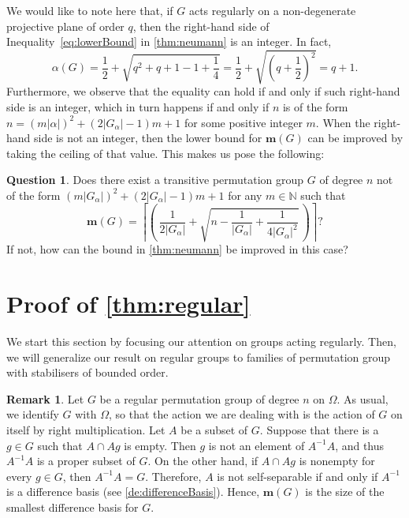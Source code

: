 \documentclass[a4paper]{amsart}
\newcommand{\m}{\mathbf{m}}
\newcommand{\NN}{\mathbb{N}}
\theoremstyle{definition}
\newtheorem{remark}[theorem]{Remark}
\newtheorem{vprasanje}[theorem]{Question}
\begin{document}
We would like to note here that, if $G$ acts regularly on a non-degenerate projective plane of order $q$, then the right-hand side of Inequality~\eqref{eq:lowerBound}  in \cref{thm:neumann} is an integer. In fact,
\[ \alpha (G) = \frac{1}{2} + \sqrt{q^2 + q + 1 - 1 + \frac{1}{4}} = \frac{1}{2} + \sqrt{\left( q + \frac{1}{2} \right) ^2 } = q+1  .\]
Furthermore, we observe that the equality can hold if and only if such right-hand side is an integer, which in turn happens if and only if $n$ is of the form $n = (m|\alpha|)^2 + (2|G_\alpha|-1)m + 1$ for some positive integer $m$. When the right-hand side is not an integer, then the lower bound for $\m(G)$ can be improved by taking the ceiling  of  that value. This makes us pose the following: 

\begin{vprasanje}
    Does there exist a transitive permutation group $G$ of degree $n$ not of the form $(m|G_\alpha|)^2 + (2|G_\alpha|-1)m + 1$ for any $m \in \NN$ such that
    \[\m(G) = \left\lceil  \left( \, \frac{1}{2|G_\alpha|} + \sqrt{n - \frac{1}{|G_\alpha|} + \frac{1}{4|G_\alpha|^2}}  \, \right)  \right \rceil ?\]
    If not, how can the bound in \cref{thm:neumann} be improved in this case?
\end{vprasanje}


	
\section{Proof of \cref{thm:regular}}\label{sec:reg}
We start this section by focusing our attention on groups acting regularly. Then, we will generalize our result on regular groups to families of permutation group with stabilisers of bounded order.

\begin{remark}\label{rem:regular}
    Let $G$ be a regular permutation group of degree $n$ on $\Omega$. As usual, we identify $G$ with $\Omega$, so that the action we are dealing with is the action of $G$ on itself by right multiplication. Let $A$ be a subset of $G$.
    Suppose that there is a $g\in G$ such that $A \cap Ag$ is empty. Then $g$ is not an element of $A^{-1}A$, and thus $A^{-1}A$ is a proper subset of $G$.
    On the other hand, if $A \cap Ag$ is nonempty for every $g\in G$, then $A^{-1}A=G$. Therefore, $A$ is not self-separable  if and only if $A^{-1}$ is a difference basis (see \cref{de:differenceBasis}). Hence, $\m(G)$ is %
    the size of the smallest difference basis for $G$. 
\end{remark}
\end{document}
